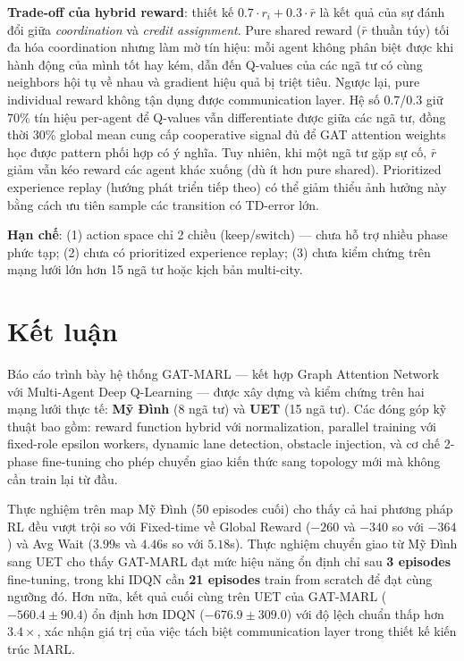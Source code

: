 \documentclass[conference]{IEEEtran}
\begin{document}
\textbf{Trade-off của hybrid reward}: thiết kế $0.7 \cdot r_i + 0.3 \cdot \bar{r}$ là kết quả của sự đánh đổi giữa \textit{coordination} và \textit{credit assignment}. Pure shared reward ($\bar{r}$ thuần túy) tối đa hóa coordination nhưng làm mờ tín hiệu: mỗi agent không phân biệt được khi hành động của mình tốt hay kém, dẫn đến Q-values của các ngã tư có cùng neighbors hội tụ về nhau và gradient hiệu quả bị triệt tiêu. Ngược lại, pure individual reward không tận dụng được communication layer. Hệ số 0.7/0.3 giữ 70\% tín hiệu per-agent để Q-values vẫn differentiate được giữa các ngã tư, đồng thời 30\% global mean cung cấp cooperative signal đủ để GAT attention weights học được pattern phối hợp có ý nghĩa. Tuy nhiên, khi một ngã tư gặp sự cố, $\bar{r}$ giảm vẫn kéo reward các agent khác xuống (dù ít hơn pure shared). Prioritized experience replay (hướng phát triển tiếp theo) có thể giảm thiểu ảnh hưởng này bằng cách ưu tiên sample các transition có TD-error lớn.

\textbf{Hạn chế}: (1) action space chỉ 2 chiều (keep/switch) --- chưa hỗ trợ nhiều phase phức tạp; (2) chưa có prioritized experience replay; (3) chưa kiểm chứng trên mạng lưới lớn hơn 15 ngã tư hoặc kịch bản multi-city.

\section{Kết luận}

Báo cáo trình bày hệ thống GAT-MARL --- kết hợp Graph Attention Network với Multi-Agent Deep Q-Learning --- được xây dựng và kiểm chứng trên hai mạng lưới thực tế: \textbf{Mỹ Đình} (8 ngã tư) và \textbf{UET} (15 ngã tư). Các đóng góp kỹ thuật bao gồm: reward function hybrid với normalization, parallel training với fixed-role epsilon workers, dynamic lane detection, obstacle injection, và cơ chế 2-phase fine-tuning cho phép chuyển giao kiến thức sang topology mới mà không cần train lại từ đầu.

Thực nghiệm trên map Mỹ Đình (50 episodes cuối) cho thấy cả hai phương pháp RL đều vượt trội so với Fixed-time về Global Reward ($-260$ và $-340$ so với $-364$) và Avg Wait ($3.99$s và $4.46$s so với $5.18$s). Thực nghiệm chuyển giao từ Mỹ Đình sang UET cho thấy GAT-MARL đạt mức hiệu năng ổn định chỉ sau \textbf{3 episodes} fine-tuning, trong khi IDQN cần \textbf{21 episodes} train from scratch để đạt cùng ngưỡng đó. Hơn nữa, kết quả cuối cùng trên UET của GAT-MARL ($-560.4 \pm 90.4$) ổn định hơn IDQN ($-676.9 \pm 309.0$) với độ lệch chuẩn thấp hơn $3.4\times$, xác nhận giá trị của việc tách biệt communication layer trong thiết kế kiến trúc MARL.
\end{document}
